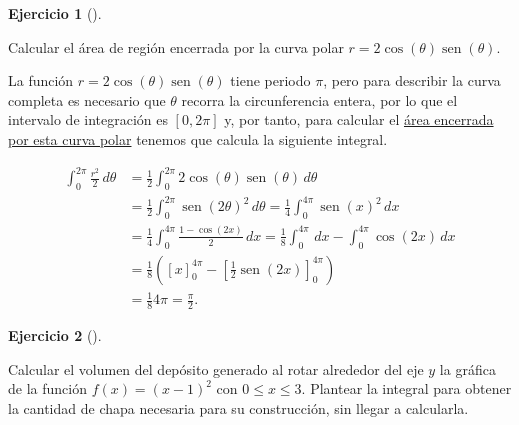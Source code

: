 \documentclass[
  spanish,
  a4paper,
]{scrreport}
\theoremstyle{definition}
\newtheorem{exercise}{Ejercicio}[chapter]
\theoremstyle{remark}
\begin{document}
\begin{exercise}[]\protect\hypertarget{exr-6}{}\label{exr-6}

Calcular el área de región encerrada por la curva polar
\(r=2\cos(\theta)\operatorname{sen}(\theta)\).

\end{exercise}

\begin{tcolorbox}[enhanced jigsaw, arc=.35mm, bottomrule=.15mm, bottomtitle=1mm, breakable, colback=white, colbacktitle=quarto-callout-tip-color!10!white, colframe=quarto-callout-tip-color-frame, coltitle=black, left=2mm, leftrule=.75mm, opacityback=0, opacitybacktitle=0.6, rightrule=.15mm, title=\textcolor{quarto-callout-tip-color}{\faLightbulb}\hspace{0.5em}{Solución}, titlerule=0mm, toprule=.15mm, toptitle=1mm]

La función \(r=2\cos(\theta)\operatorname{sen}(\theta)\) tiene periodo
\(\pi\), pero para describir la curva completa es necesario que
\(\theta\) recorra la circunferencia entera, por lo que el intervalo de
integración es \([0,2\pi]\) y, por tanto, para calcular el
\href{https://aprendeconalf.es/analisis-manual/09-integrales.html\#c\%C3\%A1lculo-del-area-encerrada-por-una-curva-en-coordenadas-polares}{área
encerrada por esta curva polar} tenemos que calcula la siguiente
integral.

\begin{align*}
\int_0^{2\pi} \frac{r^2}{2}\,d\theta 
&= \frac{1}{2}\int_0^{2\pi} 2\cos(\theta)\operatorname{sen}(\theta)\,d\theta \\
&= \frac{1}{2}\int_0^{2\pi} \operatorname{sen}(2\theta)^2\,d\theta 
= \frac{1}{4} \int_0^{4\pi} \operatorname{sen}(x)^2\,dx \tag{Cambio $x=2\theta$}\\
&= \frac{1}{4} \int_0^{4\pi} \frac{1-\cos(2x)}{2}\,dx 
= \frac{1}{8} \int_0^{4\pi}\,dx -\int_0^{4\pi} \cos(2x)\,dx \\
&= \frac{1}{8}\left([x]_0^{4\pi}-\left[\frac{1}{2}\operatorname{sen}(2x)\right]_0^{4\pi}\right) \\
&=\frac{1}{8}4\pi = \frac{\pi}{2}.
\end{align*}

\end{tcolorbox}

\begin{exercise}[]\protect\hypertarget{exr-7}{}\label{exr-7}

Calcular el volumen del depósito generado al rotar alrededor del eje
\(y\) la gráfica de la función \(f(x)=(x-1)^2\) con \(0\leq x\leq 3\).
Plantear la integral para obtener la cantidad de chapa necesaria para su
construcción, sin llegar a calcularla.

\end{exercise}
\end{document}
